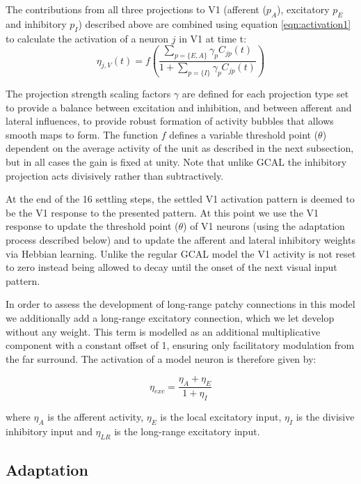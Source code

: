 The contributions from all three projections to V1 (afferent
($p_{A}$), excitatory $p_{E}$ and inhibitory $p_{I}$) described above
are combined using equation \ref{eqn:activation1} to calculate the
activation of a neuron $j$ in V1 at time t:
\begin{equation}
\eta_{j,V}(t)=f\left(\frac{\sum_{p=\{E, A\}}\gamma_{p}C_{jp}(t)}{1+\sum_{p=\{I\}}\gamma_{p}C_{jp}(t)}\right)
\label{eqn:activation1}
\end{equation}

The projection strength scaling factors $\gamma$ are defined for each
projection type set to provide a balance between excitation and
inhibition, and between afferent and lateral influences, to provide
robust formation of activity bubbles that allows smooth maps to
form. The function $f$ defines a variable threshold point ($\theta$)
dependent on the average activity of the unit as described in the next
subsection, but in all cases the gain is fixed at unity. Note that
unlike GCAL the inhibitory projection acts divisively rather than
subtractively.

At the end of the 16 settling steps, the settled V1 activation pattern
is deemed to be the V1 response to the presented pattern. At this
point we use the V1 response to update the threshold point ($\theta$)
of V1 neurons (using the adaptation process described below) and to
update the afferent and lateral inhibitory weights via Hebbian
learning. Unlike the regular GCAL model the V1 activity is not reset
to zero instead being allowed to decay until the onset of the next
visual input pattern.

In order to assess the development of long-range patchy connections in
this model we additionally add a long-range excitatory connection,
which we let develop without any weight. This term is modelled as an
additional multiplicative component with a constant offset of 1,
ensuring only facilitatory modulation from the far surround. The
activation of a model neuron is therefore given by:

\begin{equation}
  \eta_{exc} = \frac{\eta_{A} + \eta_{E}}{1 + \eta_{I}}
\end{equation}

where $\eta_A$ is the afferent activity, $\eta_E$ is the local
excitatory input, $\eta_I$ is the divisive inhibitory input and
$\eta_{LR}$ is the long-range excitatory input.

\subsection*{Adaptation}

